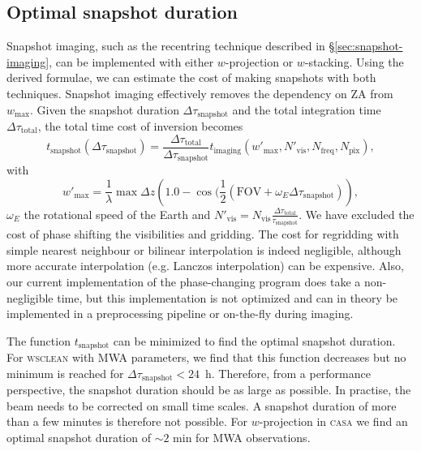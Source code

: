 \documentclass[useAMS,usenatbib]{mn2e}
\begin{document}
\subsection{Optimal snapshot duration}
Snapshot imaging, such as the recentring technique described in \S\ref{sec:snapshot-imaging}, can be implemented with either $w$-projection or $w$-stacking. Using the derived formulae, we can estimate the cost of making snapshots with both techniques. Snapshot imaging effectively removes the dependency on ZA from $w_{\max}$. Given the snapshot duration $\Delta \tau_\textrm{snapshot}$ and the total integration time $\Delta \tau_\textrm{total}$, the total time cost of inversion becomes
\begin{equation} \label{eq:snapshot-cost}
t_\textrm{snapshot}(\Delta \tau_\textrm{snapshot}) = \frac{\Delta \tau_\textrm{total}}{\Delta \tau_\textrm{snapshot}} t_\textrm{imaging}(w'_{\max},N'_\textrm{vis},N_\textrm{freq},N_\textrm{pix}),
\end{equation}
with
\begin{equation}
w'_{\max} = \frac{1}{\lambda}\max \Delta z \left(1.0 - \cos(\frac{1}{2}(\textrm{FOV} + \omega_E \Delta \tau_\textrm{snapshot})\right),
\end{equation}
$\omega_E$ the rotational speed of the Earth and $N'_\textrm{vis} = N_\textrm{vis}\frac{\Delta \tau_\textrm{total}}{\tau_\textrm{snapshot}}$. We have excluded the cost of phase shifting the visibilities and gridding. The cost for regridding with simple nearest neighbour or bilinear interpolation is indeed negligible, although more accurate interpolation (e.g. Lanczos interpolation) can be expensive. Also, our current implementation of the phase-changing program does take a non-negligible time, but this implementation is not optimized and can in theory be implemented in a preprocessing pipeline or on-the-fly during imaging.

The function $t_\textrm{snapshot}$ can be minimized to find the optimal snapshot duration. For \textsc{wsclean} with MWA parameters, we find that this function decreases but no minimum is reached for $\Delta \tau_\textrm{snapshot}<24$~h. Therefore, from a performance perspective, the snapshot duration should be as large as possible. In practise, the beam needs to be corrected on small time scales. A snapshot duration of more than a few minutes is therefore not possible. For $w$-projection in \textsc{casa} we find an optimal snapshot duration of $\sim2$ min for MWA observations.
\end{document}
